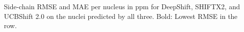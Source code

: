 Side-chain RMSE and MAE per nucleus in ppm for DeepShift, SHIFTX2, and UCBShift 2.0 on the nuclei predicted by all three. Bold: Lowest RMSE in the row.
